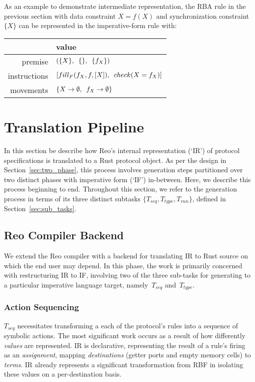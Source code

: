 As an example to demonstrate intermediate representation, the RBA rule in the previous section with data constraint $X=f(X)$
and synchronization constraint $\{X\}$ can be represented in the imperative-form rule with:

\vspace{1em}
\noindent{}
\begin{tabular}{r|l}
	\centering
		&  value \\ \hline
	premise	&  $(\{X\}, \enskip\{\}, \enskip\{f_X\})$ \\
	instructions	& $[fill_F(f_X, f, [X]), \enskip{} check(X = f_X)]$ \\
	movements	& $\{X \rightarrow{}\emptyset{}, \enskip f_X \rightarrow{}\emptyset{}\}$ 
\end{tabular}
\vspace{1em}

\section{Translation Pipeline}
In this section be describe how Reo's internal representation (`IR') of protocol specifications is translated to a Rust protocol object. As per the design in Section~\ref{sec:two_phase}, this process involves generation steps partitioned over two distinct phases with imperative form (`IF') in-between. Here, we describe this process beginning to end. Throughout this section, we refer to the generation process in terms of its three distinct subtasks $\{T_{seq}, T_{type}, T_{run}\}$, defined in Section~\ref{sec:sub_tasks}.

\subsection{Reo Compiler Backend}
\label{sec:translation_phase_1}
We extend the Reo compiler with a backend for translating IR to Rust source on which the end user may depend. In this phase, the work is primarily concerned with restructuring IR to IF, involving two of the three sub-tasks for generating to a particular imperative language target, namely~$T_{seq}$ and~$T_{type}$. 

\subsubsection{Action Sequencing}
$T_{seq}$ necessitates transforming a each of the protocol's rules into a sequence of symbolic actions. The most significant work occurs as a result of how differently \textit{values} are represented. IR is declarative, representing the result of a rule's firing as an \textit{assignment}, mapping \textit{destinations} (getter ports and empty memory cells) to \textit{terms}. IR already represents a significant transformation from RBF in isolating these values on a per-destination basis. 

